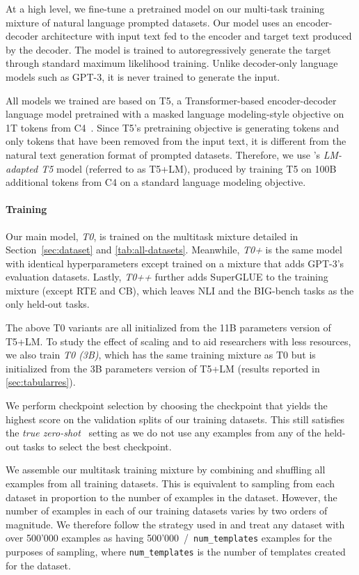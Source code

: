 At a high level, we fine-tune a pretrained model on our multi-task training mixture of natural language prompted datasets. Our model uses an encoder-decoder architecture with input text fed to the encoder and target text produced by the decoder. The model is trained to autoregressively generate the target through standard maximum likelihood training. Unlike decoder-only language models such as GPT-3, it is never trained to generate the input.

All models we trained are based on T5, a Transformer-based encoder-decoder language model pretrained with a masked language modeling-style objective on 1T tokens from C4~\citep{t5}. Since T5's pretraining objective is generating tokens and only tokens that have been removed from the input text, it is different from the natural text generation format of prompted datasets. Therefore, we use \citet{lester_prompt}'s \textit{LM-adapted T5} model (referred to as T5+LM), produced by training T5 on 100B additional tokens from C4 on a standard language modeling objective. 

\paragraph{Training} \label{sec:setup-train}
Our main model, \textit{T0}, is trained on the multitask mixture detailed in Section~\ref{sec:dataset} and \autoref{tab:all-datasets}. Meanwhile, \textit{T0+} is the same model with identical hyperparameters except trained on a mixture that adds GPT-3's evaluation datasets. Lastly, \textit{T0++} further adds SuperGLUE \citep{wang2019superglue} to the training mixture (except RTE and CB), which leaves NLI and the BIG-bench tasks as the only held-out tasks. 

The above T0 variants are all initialized from the 11B parameters version of T5+LM. To study the effect of scaling and to aid researchers with less resources, we also train \textit{T0 (3B)}, which has the same training mixture as T0 but is initialized from the 3B parameters version of T5+LM (results reported in \autoref{sec:tabularres}).

We perform checkpoint selection by choosing the checkpoint that yields the highest score on the validation splits of our training datasets. This still satisfies the \textit{true zero-shot}~\citep{true-zero-shot} setting as we do not use any examples from any of the held-out tasks to select the best checkpoint.

We assemble our multitask training mixture by combining and shuffling all examples from all training datasets. This is equivalent to sampling from each dataset in proportion to the number of examples in the dataset. However, the number of examples in each of our training datasets varies by two orders of magnitude. We therefore follow the strategy used in \citet{t5} and treat any dataset with over 500'000 examples as having 500'000~/~\texttt{num\_templates} examples for the purposes of sampling, where \texttt{num\_templates} is the number of templates created for the dataset. 

